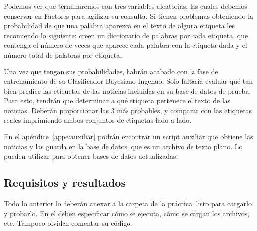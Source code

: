 Podemos ver que terminaremos con tres variables aleatorias, las cuales debemos conservar en Factores para agilizar su consulta. Si tienen problemas obteniendo la probabilidad de que una palabra aparezca en el texto de alguna etiqueta les recomiendo lo siguiente: creen un diccionario de palabras por cada etiqueta, que contenga el número de veces que aparece cada palabra con la etiqueta dada y el número total de palabras por etiqueta.

Una vez que tengan sus probabilidades, habrán acabado con la fase de entrenamiento de su Clasificador Bayesiano Ingenuo. Solo faltaría evaluar qué tan bien predice las etiquetas de las noticias incluidas en su base de datos de prueba. Para esto, tendrán que determinar a qué etiqueta pertenece el texto de las noticias. Deberán proporcionar las 3 más probables, y comparar con las etiquetas reales imprimiendo ambos conjuntos de etiquetas lado a lado.

En el apéndice~\ref{appe:auxiliar} podrán encontrar un script auxiliar que obtiene las noticias y las guarda en la base de datos, que es un archivo de texto plano. Lo pueden utilizar para obtener bases de datos actualizadas.

\subsection{Requisitos y resultados}

Todo lo anterior lo deberán anexar a la carpeta de la práctica, listo para cargarlo y probarlo. En el  deben especificar cómo se ejecuta, cómo se cargan los archivos, etc. Tampoco olviden comentar su código.
